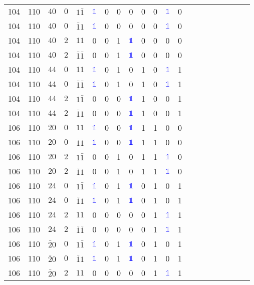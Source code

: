 \begin{longtable*}{c| cccccccccccccccccccc }
104& 110& $40$& $0$& $1\bar{1}$& \textcolor{blue}{$\mathds{1}$}& 0& 0& 0& 0& 0& \textcolor{blue}{$\mathds{1}$}& 0\\
104& 110& $40$& $0$& $\bar{1}1$& \textcolor{blue}{$\mathds{1}$}& 0& 0& 0& 0& 0& \textcolor{blue}{$\mathds{1}$}& 0\\
104& 110& $40$& $2$& $11$& 0& 0& 1& \textcolor{blue}{$\mathds{1}$}& 0& 0& 0& 0\\
104& 110& $40$& $2$& $\bar{1}\bar{1}$& 0& 0& 1& \textcolor{blue}{$\mathds{1}$}& 0& 0& 0& 0\\
104& 110& $44$& $0$& $11$& \textcolor{blue}{$\mathds{1}$}& 0& 1& 0& 1& 0& \textcolor{blue}{$\mathds{1}$}& 1\\
104& 110& $44$& $0$& $\bar{1}\bar{1}$& \textcolor{blue}{$\mathds{1}$}& 0& 1& 0& 1& 0& \textcolor{blue}{$\mathds{1}$}& 1\\
104& 110& $44$& $2$& $1\bar{1}$& 0& 0& 0& \textcolor{blue}{$\mathds{1}$}& 1& 0& 0& 1\\
104& 110& $44$& $2$& $\bar{1}1$& 0& 0& 0& \textcolor{blue}{$\mathds{1}$}& 1& 0& 0& 1\\
106& 110& $20$& $0$& $11$& \textcolor{blue}{$\mathds{1}$}& 0& 0& \textcolor{blue}{$\mathds{1}$}& 1& 1& 0& 0\\
106& 110& $20$& $0$& $\bar{1}\bar{1}$& \textcolor{blue}{$\mathds{1}$}& 0& 0& \textcolor{blue}{$\mathds{1}$}& 1& 1& 0& 0\\
106& 110& $20$& $2$& $1\bar{1}$& 0& 0& 1& 0& 1& 1& \textcolor{blue}{$\mathds{1}$}& 0\\
106& 110& $20$& $2$& $\bar{1}1$& 0& 0& 1& 0& 1& 1& \textcolor{blue}{$\mathds{1}$}& 0\\
106& 110& $24$& $0$& $1\bar{1}$& \textcolor{blue}{$\mathds{1}$}& 0& 1& \textcolor{blue}{$\mathds{1}$}& 0& 1& 0& 1\\
106& 110& $24$& $0$& $\bar{1}1$& \textcolor{blue}{$\mathds{1}$}& 0& 1& \textcolor{blue}{$\mathds{1}$}& 0& 1& 0& 1\\
106& 110& $24$& $2$& $11$& 0& 0& 0& 0& 0& 1& \textcolor{blue}{$\mathds{1}$}& 1\\
106& 110& $24$& $2$& $\bar{1}\bar{1}$& 0& 0& 0& 0& 0& 1& \textcolor{blue}{$\mathds{1}$}& 1\\
106& 110& $\bar{2}0$& $0$& $1\bar{1}$& \textcolor{blue}{$\mathds{1}$}& 0& 1& \textcolor{blue}{$\mathds{1}$}& 0& 1& 0& 1\\
106& 110& $\bar{2}0$& $0$& $\bar{1}1$& \textcolor{blue}{$\mathds{1}$}& 0& 1& \textcolor{blue}{$\mathds{1}$}& 0& 1& 0& 1\\
106& 110& $\bar{2}0$& $2$& $11$& 0& 0& 0& 0& 0& 1& \textcolor{blue}{$\mathds{1}$}& 1\\

\end{longtable*}

